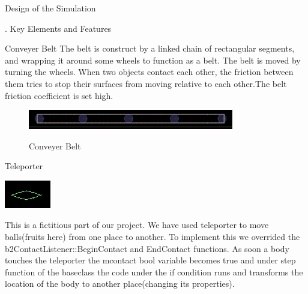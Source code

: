 \documentclass[a4paper,11pt]{resume}
\begin{document}
\begin{rSection}{{\heading Design of the Simulation}}
\begin{rSubsection}{{. Key Elements and Features}}{}{}{}
\begin{rSubsection}{{ Conveyer Belt}}{}{}{}
The belt is construct by a linked chain of rectangular segments, and wrapping it around some wheels to function as a belt. The belt is moved by turning the wheels. When two objects contact each other, the friction between them tries to stop their surfaces from moving relative to each other.The belt friction coefficient is set high.
\begin{figure}[h]
\centering
\includegraphics[width=0.8\textwidth]{conveyer.jpg}
\label{fig:find}
\caption{Conveyer Belt}
\end{figure}
\end{rSubsection}
\newpage
\begin{rSubsection}{{ Teleporter}}{}{}{}
\begin{minipage}{0.15\textwidth}
\centering
\includegraphics[width=\textwidth]{teleporter.png}
\label{fig:find}
\caption{Teleporter}

\end{minipage}
\begin{minipage}{0.80\textwidth}
This is a fictitious part of our project. We have used teleporter to move balls(fruits here) from one place to another. To implement this we overrided the b2ContactListener::BeginContact and EndContact functions. As soon a body touches the teleporter the mcontact bool variable becomes true and under step function of the base\underscoresim\underscoret class the code under the if condition runs and transforms the location of the body to another place(changing its properties).
\end{minipage}
\end{rSubsection}


\end{rSubsection}
\end{rSection}
\end{document}
